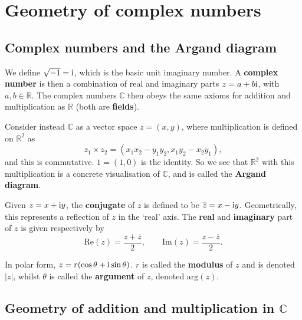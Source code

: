 \documentclass[letter-paper]{tufte-book}
\newcommand{\zi}{{\rm i}}
\newcommand\Real{\mbox{Re}} %
\newcommand\Imag{\mbox{Im}} %
\newcommand{\zbar}{{\overline{z}}}
\newcommand\Def[1]{\textbf{#1}}
\begin{document}

\chapter{Geometry of complex numbers}


\section{Complex numbers and the Argand diagram}

We define $\sqrt{-1}=\zi$, which is the basic unit imaginary number. A
\Def{complex number} is then a combination of real and imaginary parts
$z=a+b\zi$, with $a,b\in\mathbb{R}$. The complex numbers $\mathbb{C}$ then obeys
the same axioms for addition and multiplication as $\mathbb{R}$ (both are
\Def{fields}).

Consider instead $\mathbb{C}$ as a vector space $z=(x,y)$, where multiplication
is defined on $\mathbb{R}^2$ as
\begin{equation*}
	z_1\times z_2 = (x_1 x_2 - y_1 y_2, x_1 y_2 - x_2 y_1),
\end{equation*}
and this is commutative. $1=(1,0)$ is the identity. So we see that
$\mathbb{R}^2$ with this multiplication is a concrete visualisation of
$\mathbb{C}$, and is called the \Def{Argand diagram}.

Given $z=x+\zi y$, the \Def{conjugate} of $z$ is defined to be
$\zbar=x-\zi y$. Geometrically, this represents a reflection of $z$ in the
`real' axis. The \Def{real} and \Def{imaginary} part of $z$ is
given respectively by
\begin{equation*}
	\Real(z)=\frac{z+\zbar}{2},\qquad \Imag(z)=\frac{z-\zbar}{2}.
\end{equation*}

In polar form, $z=r(\cos\theta+\zi\sin\theta)$. $r$ is called the
\Def{modulus} of $z$ and is denoted $|z|$, whilst $\theta$ is called the
\Def{argument} of $z$, denoted $\mbox{arg}(z)$.


\section{Geometry of addition and multiplication in $\mathbb{C}$}
\end{document}
